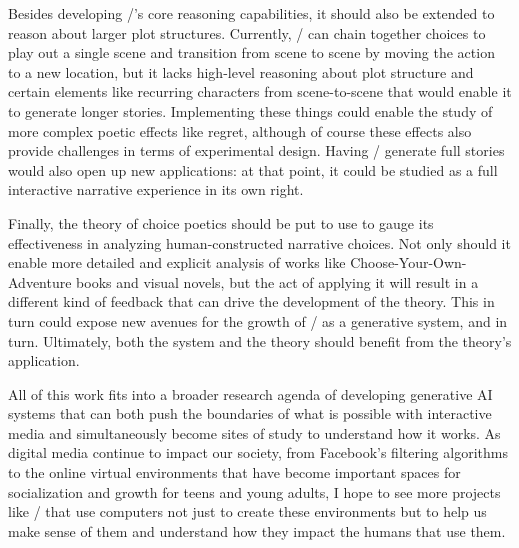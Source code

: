 Besides developing \dunyazad/'s core reasoning capabilities, it should also be extended to reason about larger plot structures.
%
Currently, \dunyazad/ can chain together choices to play out a single scene and transition from scene to scene by moving the action to a new location, but it lacks high-level reasoning about plot structure and certain elements like recurring characters from scene-to-scene that would enable it to generate longer stories.
%
Implementing these things could enable the study of more complex poetic effects like regret, although of course these effects also provide challenges in terms of experimental design.
%
Having \dunyazad/ generate full stories would also open up new applications: at that point, it could be studied as a full interactive narrative experience in its own right.


Finally, the theory of choice poetics should be put to use to gauge its effectiveness in analyzing human-constructed narrative choices.
%
Not only should it enable more detailed and explicit analysis of works like Choose-Your-Own-Adventure books and visual novels, but the act of applying it will result in a different kind of feedback that can drive the development of the theory.
%
This in turn could expose new avenues for the growth of \dunyazad/ as a generative system, and in turn.
%
Ultimately, both the system and the theory should benefit from the theory's application.


All of this work fits into a broader research agenda of developing generative AI systems that can both push the boundaries of what is possible with interactive media and simultaneously become sites of study to understand how it works.
%
As digital media continue to impact our society, from Facebook's filtering algorithms to the online virtual environments that have become important spaces for socialization and growth for teens and young adults, I hope to see more projects like \dunyazad/ that use computers not just to create these environments but to help us make sense of them and understand how they impact the humans that use them.
